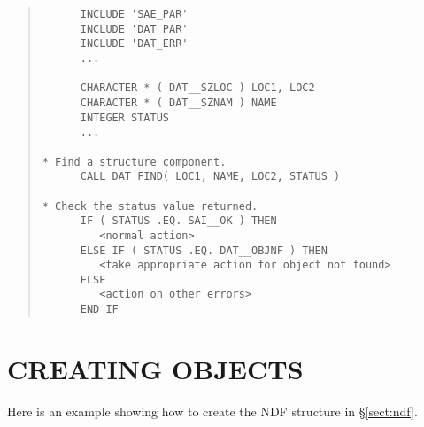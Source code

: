 \documentclass[twoside,11pt]{article}
\newcommand{\xlabel}[1]{}
\renewcommand{\_}{\texttt{\symbol{95}}}
\begin{document}
\small
\begin{quote}
\begin{verbatim}
      INCLUDE 'SAE_PAR'
      INCLUDE 'DAT_PAR'
      INCLUDE 'DAT_ERR'
      ...

      CHARACTER * ( DAT__SZLOC ) LOC1, LOC2
      CHARACTER * ( DAT__SZNAM ) NAME
      INTEGER STATUS
      ...

* Find a structure component.
      CALL DAT_FIND( LOC1, NAME, LOC2, STATUS )

* Check the status value returned.
      IF ( STATUS .EQ. SAI__OK ) THEN
         <normal action>
      ELSE IF ( STATUS .EQ. DAT__OBJNF ) THEN
         <take appropriate action for object not found>
      ELSE
         <action on other errors>
      END IF
\end{verbatim}
\end{quote}
\normalsize

\section{\xlabel{creating_objects}\label{sect:creating}CREATING OBJECTS}

Here is an example showing how to create the NDF structure in
\S\ref{sect:ndf}.
\end{document}
